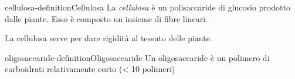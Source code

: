 \documentclass[preview]{standalone}
\begin{document}
\begin{snippetdefinition}{cellulosa-definition}{Cellulosa}
    La \textit{cellulosa} è un polisaccaride di glucosio prodotto dalle piante.
    Esso è composto un insieme di fibre lineari.
\end{snippetdefinition}

\begin{plainhtml}
    La cellulosa serve per dare rigidità al tessuto delle piante.
\end{plainhtml}

\begin{snippetdefinition}{oligosaccaride-definition}{Oligosaccaride}
  Un oligosaccaride è un polimero di carboidrati relativamente corto (< 10 polimeri)
\end{snippetdefinition}

\end{document}
